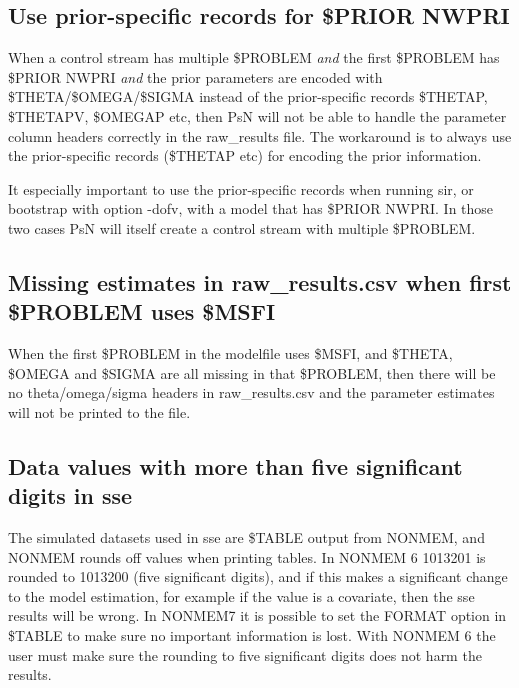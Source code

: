 \subsection{Use prior-specific records for \$PRIOR NWPRI}
When a control stream has multiple \$PROBLEM \emph{and} the first \$PROBLEM has \$PRIOR NWPRI \emph{and} the prior parameters are encoded with \$THETA/\$OMEGA/\$SIGMA instead of the prior-specific records \$THETAP, \$THETAPV, \$OMEGAP etc, then PsN will not be able to handle the parameter column headers correctly in the raw\_results file. The workaround is to always use the prior-specific records (\$THETAP etc) for encoding the prior information.

It especially important to use the prior-specific records when running sir, or bootstrap with option -dofv, with a model that has \$PRIOR NWPRI. In those two cases PsN will itself create a control stream with multiple \$PROBLEM.

\subsection{Missing estimates in raw\_results.csv when first \$PROBLEM uses \$MSFI}
When the first \$PROBLEM in the modelfile uses \$MSFI, and \$THETA, \$OMEGA and \$SIGMA are all missing in that \$PROBLEM, then there will be no theta/omega/sigma headers in raw\_results.csv and the parameter estimates will not be printed to the file.

\subsection{Data values with more than five significant digits in sse}
The simulated datasets used in sse are \$TABLE output from NONMEM, and NONMEM rounds off values when printing tables. In NONMEM 6 1013201 is rounded to 1013200 (five significant digits), and if this makes a significant change to the model estimation, for example if the value is a covariate, then the sse results will be wrong. In NONMEM7 it is possible to set the FORMAT option in \$TABLE to make sure no important information is lost. With NONMEM 6 the user must make sure the rounding to five significant digits does not harm the results.


